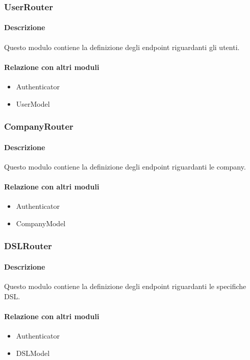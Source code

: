 \subsubsection{UserRouter}
\paragraph*{Descrizione}
Questo modulo contiene la definizione degli endpoint riguardanti gli utenti. 

\paragraph*{Relazione con altri moduli}
\begin{itemize}
\item Authenticator
\item UserModel
\end{itemize}

\subsubsection{CompanyRouter}
\paragraph*{Descrizione}
Questo modulo contiene la definizione degli endpoint riguardanti le company.

\paragraph*{Relazione con altri moduli}
\begin{itemize}
\item Authenticator
\item CompanyModel
\end{itemize}

\subsubsection{DSLRouter}
\paragraph*{Descrizione}
Questo modulo contiene la definizione degli endpoint riguardanti le specifiche DSL.

\paragraph*{Relazione con altri moduli}
\begin{itemize}
\item Authenticator
\item DSLModel
\end{itemize}

